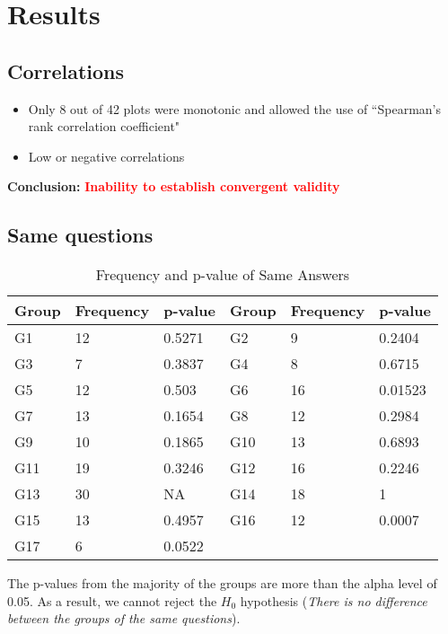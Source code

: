 \section{Results}

\subsection{Correlations}

\begin{itemize}
	\item Only 8 out of 42 plots were monotonic and allowed the use of  ``Spearman's rank correlation coefficient"
	\item Low or negative correlations
\end{itemize}

\textbf{Conclusion:} \textcolor{red}{\textbf{Inability to establish convergent validity}}

\clearpage

\subsection{Same questions} 

\begin{table} [H]
	\begin{tabular}{| p{1cm} | p{1.5cm} | p{1.5cm} | p{2cm} | p{1.5cm} | p{1.5cm} |} \hline
		Group & Frequency & p-value & Group & Frequency & p-value \\ \hline
		G1 & 12 & 0.5271 & G2 & 9 & 0.2404 \\ \hline
		G3 & 7 & 0.3837 & G4 & 8 & 0.6715 \\ \hline
		G5 & 12 & 0.503 & G6 & 16 & 0.01523 \\ \hline
		G7 & 13 & 0.1654 & G8 & 12 & 0.2984 \\ \hline
		G9 & 10 & 0.1865 & G10 & 13 & 0.6893 \\ \hline
		G11 & 19 & 0.3246 & G12 & 16 & 0.2246 \\ \hline
		G13 & 30 & NA & G14 & 18 & 1 \\ \hline
		G15 & 13 & 0.4957 & G16 & 12 & 0.0007 \\ \hline
		G17 & 6 & 0.0522 & & & \\ \hline
	\end{tabular}
	\caption{Frequency and p-value of Same Answers}
	\label{table:answers_frequency}
\end{table}

The p-values from the majority of the groups are more than the alpha level of 0.05. As a result, we cannot reject the $H_0$ hypothesis ({\scriptsize \textit{There is no difference between the groups of the same questions}}).

